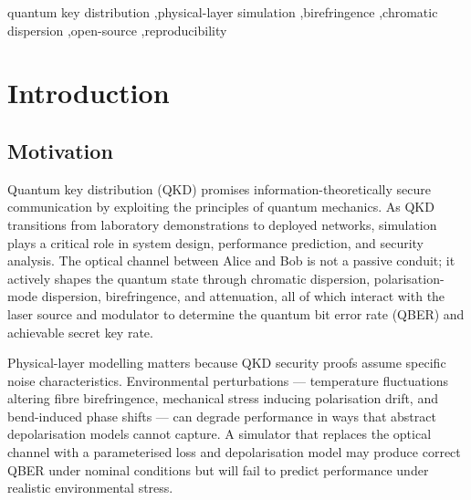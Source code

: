 \documentclass[3p,times,preprint]{elsarticle}
\begin{document}
\begin{frontmatter}
\begin{abstract}
The system-level demonstrations confirm validated components compose
correctly: a five-panel BB84 sweep under combined impairments and a
time-bin BB84 validation matching Gobby's QBER vs distance.  The framework
is fully reproducible (seeded RNG, version-controlled, 77~unit tests passing)
and available at \url{https://github.com/azaan-mahmood/opto-sim-dev}.
\end{abstract}

\begin{keyword}
quantum key distribution \sep physical-layer simulation \sep birefringence
\sep chromatic dispersion \sep open-source \sep reproducibility
\end{keyword}

\end{frontmatter}

\section{Introduction}

\subsection{Motivation}

Quantum key distribution (QKD) promises information-theoretically secure
communication by exploiting the principles of quantum mechanics.  As QKD
transitions from laboratory demonstrations to deployed networks,
simulation plays a critical role in system design, performance prediction,
and security analysis.  The optical channel between Alice and Bob is not
a passive conduit; it actively shapes the quantum state through chromatic
dispersion, polarisation-mode dispersion, birefringence, and attenuation,
all of which interact with the laser source and modulator to determine
the quantum bit error rate (QBER) and achievable secret key rate.

Physical-layer modelling matters because QKD security proofs assume
specific noise characteristics.  Environmental perturbations --- temperature
fluctuations altering fibre birefringence, mechanical stress inducing
polarisation drift, and bend-induced phase shifts --- can degrade
performance in ways that abstract depolarisation models cannot capture.
A simulator that replaces the optical channel with a parameterised loss
and depolarisation model may produce correct QBER under nominal conditions
but will fail to predict performance under realistic environmental stress.
\end{document}
